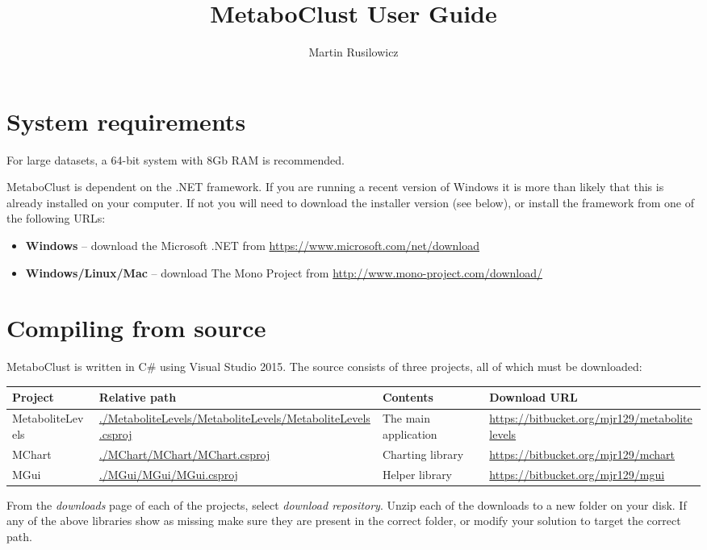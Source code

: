 \documentclass[11pt,a4paper]{article}
\title{MetaboClust User Guide}
\author{Martin Rusilowicz}
\begin{document}
\maketitle

\section{System requirements}
For large datasets, a 64-bit system with 8Gb RAM is recommended.

MetaboClust is dependent on the .NET framework. If you are running a recent version of Windows it is more than likely that this is already installed on your computer. If not you will need to download the installer version (see below), or install the framework from one of the following URLs:

\begin{itemize}
	\item \textbf{Windows} -- download the Microsoft .NET from \url{https://www.microsoft.com/net/download}
	\item \textbf{Windows/Linux/Mac} -- download The Mono Project from \url{http://www.mono-project.com/download/}
\end{itemize}

\section{Compiling from source}
MetaboClust is written in C\# using Visual Studio 2015. The source consists of three projects, all of which must be downloaded:

\begin{tabularx}{\linewidth}{l X X X}
	\textbf{Project} & \textbf{Relative path} & \textbf{Contents} & \textbf{Download URL} \\ \hline
	MetaboliteLevels & \url{./MetaboliteLevels/MetaboliteLevels/MetaboliteLevels.csproj} & The main application & \url{https://bitbucket.org/mjr129/metabolitelevels} \\
	MChart & \url{./MChart/MChart/MChart.csproj} & Charting library & \url{https://bitbucket.org/mjr129/mchart} \\
	MGui & \url{./MGui/MGui/MGui.csproj} & Helper library & \url{https://bitbucket.org/mjr129/mgui} \\
\end{tabularx}

From the \textit{downloads} page of each of the projects, select \textit{download repository}. Unzip each of the downloads to a new folder on your disk. If any of the above libraries show as missing make sure they are present in the correct folder, or modify your solution to target the correct path.
\end{document}
